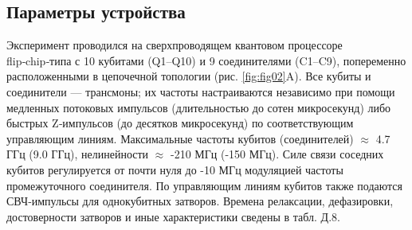 
\subsection*{Параметры устройства}

Эксперимент проводился на сверхпроводящем квантовом процессоре
flip‑chip‑типа \cite{cite_44} с 10 кубитами (Q1–Q10) и 9 соединителями (C1–C9),
попеременно расположенными в цепочечной топологии (рис. \ref{fig:fig02}A). Все
кубиты и соединители — трансмоны; их частоты настраиваются независимо при
помощи медленных потоковых импульсов (длительностью до сотен микросекунд) либо
быстрых Z‑импульсов (до десятков микросекунд) по соответствующим управляющим
линиям. Максимальные частоты кубитов (соединителей) $\approx$ 4.7 ГГц (9.0
ГГц), нелинейности $\approx$ -210 МГц (-150 МГц). Силе связи соседних кубитов
регулируется от почти нуля до -10 МГц модуляцией частоты промежуточного
соединителя. По управляющим линиям кубитов также подаются СВЧ‑импульсы для
однокубитных затворов. Времена релаксации, дефазировки, достоверности затворов
и иные характеристики сведены в табл. Д.8.

